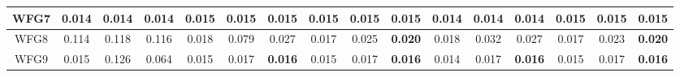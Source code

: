 \begin{table}[]
{\begin{tabular}{c|c|c|c|c|c|c|c|c|c|c|c|c|c|c|c|}
\multicolumn{1}{|c|}{WFG7} & 0.014 & 0.014 & \textbf{0.014} & 0.015 & 0.015 & 0.015 & 0.015 & 0.015 & 0.015 & 0.014 & 0.014 & \textbf{0.014} & 0.015 & 0.015 & 0.015 \\ \hline
\multicolumn{1}{|c|}{WFG8} & 0.114 & 0.118 & 0.116 & 0.018 & 0.079 & 0.027 & 0.017 & 0.025 & \textbf{0.020} & 0.018 & 0.032 & 0.027 & 0.017 & 0.023 & \textbf{0.020} \\ \hline
\multicolumn{1}{|c|}{WFG9} & 0.015 & 0.126 & 0.064 & 0.015 & 0.017 & \textbf{0.016} & 0.015 & 0.017 & \textbf{0.016} & 0.014 & 0.017 & \textbf{0.016} & 0.015 & 0.017 & \textbf{0.016} \\ \hline
\end{tabular}%
}
\end{table}

